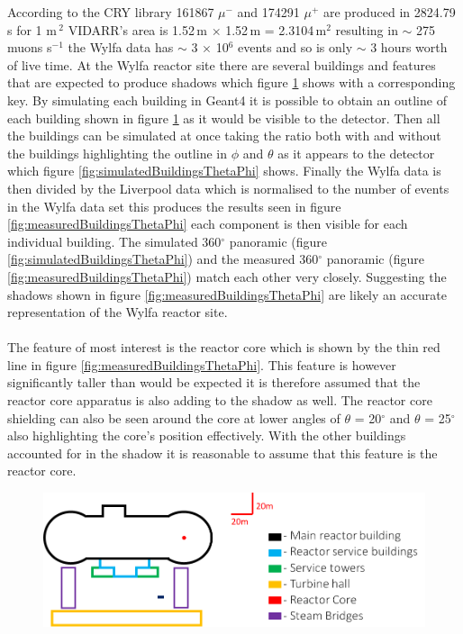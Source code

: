 \documentclass[12pt,a4paper]{article}
\begin{document}
According to the CRY library \cite{ieee_cry_2007} 161867 $\mu^-$ and 174291 $\mu^+$ are produced in 2824.79\,s for 1 m\,$^2$ VIDARR's area is 1.52\,m $\times$ 1.52\,m = 2.3104\,m$^2$ resulting in $\sim$ 275 muons s$^{-1}$ the Wylfa data has $\sim$ 3 $\times$ 10$^6$ events and so is only $\sim$ 3 hours worth of live time. At the Wylfa reactor site there are several buildings and features that are expected to produce shadows which figure \ref{fig:wylfaTraceOfBuildings} shows with a corresponding key. By simulating each building in Geant4 it is possible to obtain an outline of each building shown in figure \ref{fig:wylfaTraceOfBuildings} as it would be visible to the detector. Then all the buildings can be simulated at once taking the ratio both with and without the buildings highlighting the outline in $\phi$ and $\theta$ as it appears to the detector which figure \ref{fig:simulatedBuildingsThetaPhi} shows. Finally the Wylfa data is then divided by the Liverpool data which is normalised to the number of events in the Wylfa data set this produces the results seen in figure \ref{fig:measuredBuildingsThetaPhi} each component is then visible for each individual building. The simulated 360$^\circ$ panoramic (figure \ref{fig:simulatedBuildingsThetaPhi}) and the measured 360$^\circ$ panoramic (figure \ref{fig:measuredBuildingsThetaPhi}) match each other very closely. Suggesting the shadows shown in figure \ref{fig:measuredBuildingsThetaPhi} are likely an accurate representation of the Wylfa reactor site.
\\\\The feature of most interest is the reactor core which is shown by the thin red line in figure \ref{fig:measuredBuildingsThetaPhi}. This feature is however significantly taller than would be expected it is therefore assumed that the reactor core apparatus is also adding to the shadow as well. The reactor core shielding can also be seen around the core at lower angles of $\theta$ = 20$^\circ$ and $\theta$ = 25$^\circ$ also highlighting the core's position effectively. With the other buildings accounted for in the shadow it is reasonable to assume that this feature is the reactor core. 

\begin{figure}[H]
 \centering
 \includegraphics[width=1.0\linewidth]{wylfaReactorBuildings/wylfaTrace+key.png}
 \label{fig:wylfaTraceOfBuildings}
\end{figure}
\end{document}
